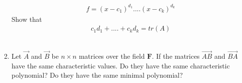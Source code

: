 \begin{enumerate}[label=\thesubsection.\arabic*.,ref=\thesubsection.\theenumi]
\begin{align}
& f = (x-c_1)^{d_1}....(x-c_k)^{d_k} 
\end{align}
Show that
\begin{align}
& c_1d_1+....+c_kd_k = tr(A)
\end{align}
%
%
\\
\solution

\twocolumn
\item 	Let $\vec{A}$ and $\vec{B}$ be $n\times n$ matrices over the field $\mathbf{F}$. If the matrices $\vec{AB}$ and $\vec{BA}$ have the same characteristic values. Do they have the same characteristic polynomial? Do they have the same minimal polynomial? 
%
%
\end{enumerate}
